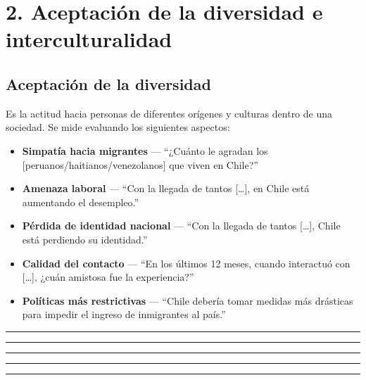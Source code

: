 \documentclass[
  spanish,
  letterpaper,
  DIV=11,
  numbers=noendperiod,
  oneside]{scrartcl}
\begin{document}
\section{2. Aceptación de la diversidad e
interculturalidad}\label{aceptaciuxf3n-de-la-diversidad-e-interculturalidad}

\subsection{Aceptación de la
diversidad}\label{aceptaciuxf3n-de-la-diversidad}

Es la actitud hacia personas de diferentes orígenes y culturas dentro de
una sociedad. Se mide evaluando los siguientes aspectos:

\begin{itemize}
\item
  \textbf{Simpatía hacia migrantes} --- ``¿Cuánto le agradan los
  {[}peruanos/haitianos/venezolanos{]} que viven en Chile?''
\item
  \textbf{Amenaza laboral} --- ``Con la llegada de tantos {[}\ldots{]},
  en Chile está aumentando el desempleo.''
\item
  \textbf{Pérdida de identidad nacional} --- ``Con la llegada de tantos
  {[}\ldots{]}, Chile está perdiendo su identidad.''
\item
  \textbf{Calidad del contacto} --- ``En los últimos 12 meses, cuando
  interactuó con {[}\ldots{]}, ¿cuán amistosa fue la experiencia?''
\item
  \textbf{Políticas más restrictivas} --- ``Chile debería tomar medidas
  más drásticas para impedir el ingreso de inmigrantes al país.''
\end{itemize}

\begin{center}\rule{0.5\linewidth}{0.5pt}\end{center}

\begin{center}\rule{0.5\linewidth}{0.5pt}\end{center}

\begin{center}\rule{0.5\linewidth}{0.5pt}\end{center}

\begin{center}\rule{0.5\linewidth}{0.5pt}\end{center}

\begin{center}\rule{0.5\linewidth}{0.5pt}\end{center}
\end{document}
